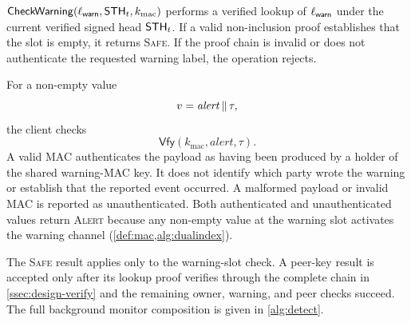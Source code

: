 \begin{definition}\label{def:dualindex-check}
$\mathsf{CheckWarning}(\ell_{\mathsf{warn}},\mathsf{STH}_t,k_{\mathrm{mac}})$ performs a verified lookup of
$\ell_{\mathsf{warn}}$ under the current verified signed head $\mathsf{STH}_t$. If a valid non-inclusion proof
establishes that the slot is empty, it returns \textsc{Safe}. If the proof chain is invalid or does
not authenticate the requested warning label, the operation rejects.

For a non-empty value
\[
v=\mathit{alert}\,\|\,\tau,
\]
the client checks
\[
\mathsf{Vfy}(k_{\mathrm{mac}},\mathit{alert},\tau).
\]
A valid MAC authenticates the payload as having been produced by a holder of the shared warning-MAC
key. It does not identify which party wrote the warning or establish that the reported event
occurred. A malformed payload or invalid MAC is reported as unauthenticated. Both authenticated and
unauthenticated values return \textsc{Alert} because any non-empty value at the warning slot
activates the warning channel (\cref{def:mac,alg:dualindex}).

The \textsc{Safe} result applies only to the warning-slot check. A peer-key result is accepted only
after its lookup proof verifies through the complete chain in \cref{ssec:design-verify} and the
remaining owner, warning, and peer checks succeed. The full background monitor composition is given
in \cref{alg:detect}.
\end{definition}

